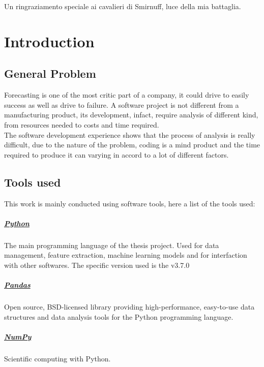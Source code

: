 \documentclass[%
    corpo=12pt,
    twoside,
    oldstyle,
    autoretitolo,
    greek,
    evenboxes,
]{toptesi}
\begin{document}
Un ringraziamento speciale ai cavalieri di Smirnuff, luce della mia battaglia.

\indici

\mainmatter


\chapter{Introduction}

\section{General Problem}
Forecasting is one of the most critic part of a company, it could drive to easily success as well as drive to failure. A software project is not different from a manufacturing product, its development, infact, require analysis of different kind, from resources needed to costs and time required.\\
The software development experience shows that the process of analysis is really difficult, due to the nature of the problem, coding is a mind product and the time required to produce it can varying in accord to a lot of different factors.

\section{Tools used}
This work is mainly conducted using software tools, here a list of the tools used:

\paragraph{\href{https://www.python.org/}{Python}} The main programming language of the thesis project. Used for data management, feature extraction, machine learning models and for interfaction with other softwares. The specific version used is the v3.7.0

\paragraph{\href{https://pandas.pydata.org/}{Pandas}} Open source, BSD-licensed library providing high-performance, easy-to-use data structures and data analysis tools for the Python programming language.

\paragraph{\href{https://numpy.org/}{NumPy}} Scientific computing with Python.
\end{document}
